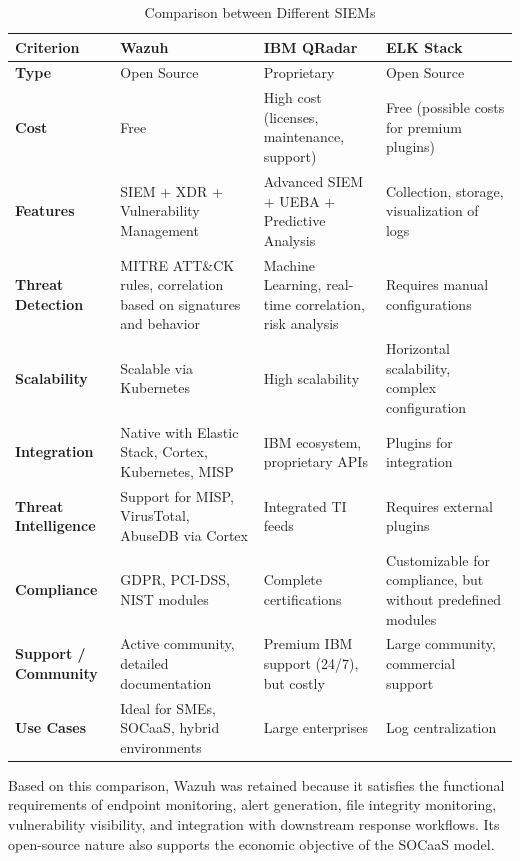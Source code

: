 \begin{table}[H]
\centering
\caption{Comparison between Different SIEMs}
\label{tab:siem-compare}
\footnotesize
\setlength{\tabcolsep}{3pt}
\renewcommand{\arraystretch}{1.3}
\begin{tabular}{>{\RaggedRight\arraybackslash}p{2.8cm} >{\RaggedRight\arraybackslash}p{3cm} >{\RaggedRight\arraybackslash}p{3cm} >{\RaggedRight\arraybackslash}p{3cm}}
\toprule
\rowcolor{tableheader}
\textbf{Criterion} & \textbf{Wazuh} & \textbf{IBM QRadar} & \textbf{ELK Stack} \\
\midrule
\textbf{Type} & Open Source & Proprietary & Open Source \\
\midrule
\textbf{Cost} & Free & High cost (licenses, maintenance, support) & Free (possible costs for premium plugins) \\
\midrule
\textbf{Features} & SIEM + XDR + Vulnerability Management & Advanced SIEM + UEBA + Predictive Analysis & Collection, storage, visualization of logs \\
\midrule
\textbf{Threat Detection} & MITRE ATT\&CK rules, correlation based on signatures and behavior & Machine Learning, real-time correlation, risk analysis & Requires manual configurations \\
\midrule
\textbf{Scalability} & Scalable via Kubernetes & High scalability & Horizontal scalability, complex configuration \\
\midrule
\textbf{Integration} & Native with Elastic Stack, Cortex, Kubernetes, MISP & IBM ecosystem, proprietary APIs & Plugins for integration \\
\midrule
\textbf{Threat Intelligence} & Support for MISP, VirusTotal, AbuseDB via Cortex & Integrated TI feeds & Requires external plugins \\
\midrule
\textbf{Compliance} & GDPR, PCI-DSS, NIST modules & Complete certifications & Customizable for compliance, but without predefined modules \\
\midrule
\textbf{Support / Community} & Active community, detailed documentation & Premium IBM support (24/7), but costly & Large community, commercial support \\
\midrule
\textbf{Use Cases} & Ideal for SMEs, SOCaaS, hybrid environments & Large enterprises & Log centralization \\
\bottomrule
\end{tabular}
\end{table}

Based on this comparison, Wazuh was retained because it satisfies the functional requirements of endpoint monitoring, alert generation, file integrity monitoring, vulnerability visibility, and integration with downstream response workflows. Its open-source nature also supports the economic objective of the SOCaaS model.

